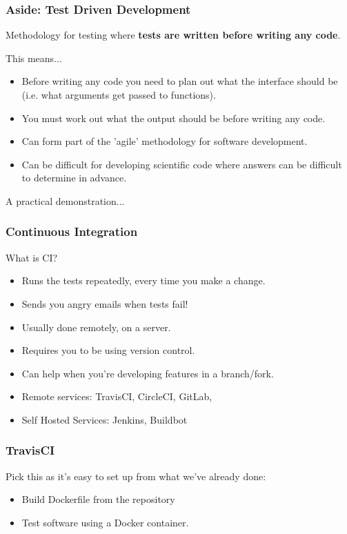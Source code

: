 \documentclass{beamer}
\begin{document}
\begin{frame}
    \frametitle{Aside: Test Driven Development}
    Methodology for testing where \textbf{tests are written before writing any code}.

    This means...
    \begin{itemize}
    \item Before writing any code you need to plan out what the interface should be (i.e. what arguments get passed to functions).
    \item You must work out what the output should be before writing any code.
    \item Can form part of the 'agile' methodology for software development.
    \item Can be difficult for developing scientific code where answers can be difficult to determine in advance.
    \end{itemize}
\end{frame}

\begin{frame}
    \centering 
    A practical demonstration...
\end{frame}


\begin{frame}
    \frametitle{Continuous Integration}
    What is CI?
    \begin{itemize}
        \item Runs the tests repeatedly, every time you make a change.
        \item Sends you angry emails when tests fail!
        \item Usually done remotely, on a server.
        \item Requires you to be using version control.
        \item Can help when you're developing features in a branch/fork.
        \item Remote services: TravisCI, CircleCI, GitLab, 
        \item Self Hosted Services: Jenkins, Buildbot
    \end{itemize}
\end{frame}

\begin{frame}
    \frametitle{TravisCI}
    Pick this as it's easy to set up from what we've already done:
    \begin{itemize}
    \item Build Dockerfile from the repository
    \item Test software using a Docker container.
    \end{itemize}
\end{frame}
\end{document}
